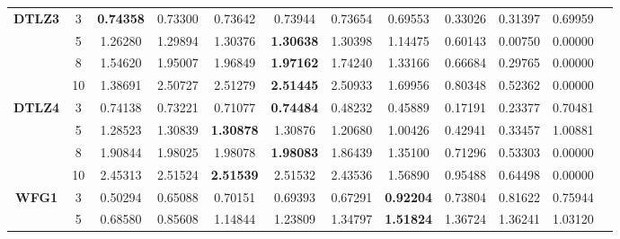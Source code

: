 \documentclass{sig-alternate}
\begin{document}
\begin{table}[!htb]
\begin{tabular}{|c|c|c|c|c|c|c|c|c|c|c|c|}
\multirow{4}{*}{\textbf{DTLZ3}} & 3          & \textbf{0.74358} & 0.73300           & 0.73642               & 0.73944          & 0.73654             & 0.69553             & 0.33026            & 0.31397              & 0.69959          \\ \cline{2-11} 
& 5          & 1.26280          & 1.29894           & 1.30376               & \textbf{1.30638} & 1.30398             & 1.14475             & 0.60143            & 0.00750              & 0.00000          \\ \cline{2-11} 
& 8          & 1.54620          & 1.95007           & 1.96849               & \textbf{1.97162} & 1.74240             & 1.33166             & 0.66684            & 0.29765              & 0.00000          \\ \cline{2-11} 
& 10         & 1.38691          & 2.50727           & 2.51279               & \textbf{2.51445} & 2.50933             & 1.69956             & 0.80348            & 0.52362              & 0.00000          \\ \hline
\multirow{4}{*}{\textbf{DTLZ4}} & 3          & 0.74138          & 0.73221           & 0.71077               & \textbf{0.74484} & 0.48232             & 0.45889             & 0.17191            & 0.23377              & 0.70481          \\ \cline{2-11} 
& 5          & 1.28523          & 1.30839           & \textbf{1.30878}      & 1.30876          & 1.20680             & 1.00426             & 0.42941            & 0.33457              & 1.00881          \\ \cline{2-11} 
& 8          & 1.90844          & 1.98025           & 1.98078               & \textbf{1.98083} & 1.86439             & 1.35100             & 0.71296            & 0.53303              & 0.00000          \\ \cline{2-11} 
& 10         & 2.45313          & 2.51524           & \textbf{2.51539}      & 2.51532          & 2.43536             & 1.56890             & 0.95488            & 0.64498              & 0.00000          \\ \hline
\multirow{4}{*}{\textbf{WFG1}}  & 3          & 0.50294          & 0.65088           & 0.70151               & 0.69393          & 0.67291             & \textbf{0.92204}    & 0.73804            & 0.81622              & 0.75944          \\ \cline{2-11} 
& 5          & 0.68580          & 0.85608           & 1.14844               & 1.23809          & 1.34797             & \textbf{1.51824}    & 1.36724            & 1.36241              & 1.03120          \\ \cline{2-11} 

\end{tabular}
\end{table}
\end{document}
